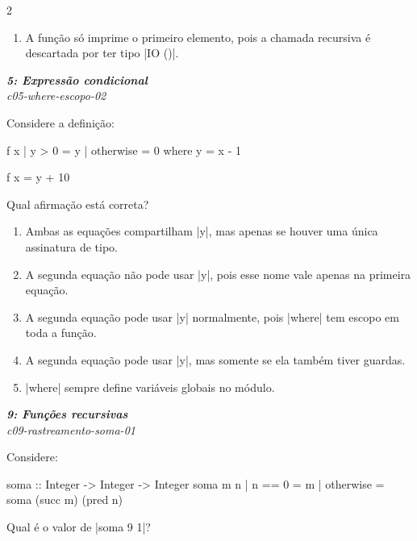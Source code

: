 \documentclass[a4paper,10pt,brazil]{article}
\begin{document}
\begin{multicols}{2}
\begin{enumerate}
  \item A função só imprime o primeiro elemento, pois a chamada recursiva é descartada por ter tipo \haskellinline|IO ()|.


\end{enumerate}

\begin{flushright}
  \footnotesize
  \textit{\textbf{5: Expressão condicional}}\\
  \textit{c05-where-escopo-02}\\

\end{flushright}
Considere a definição:
\begin{haskellcode}
f x
  | y > 0     = y
  | otherwise = 0
  where y = x - 1

f x = y + 10
\end{haskellcode}
Qual afirmação está correta?

\begin{enumerate}
  \item Ambas as equações compartilham \haskellinline|y|, mas apenas se houver uma única assinatura de tipo.

  \item A segunda equação não pode usar \haskellinline|y|, pois esse nome vale apenas na primeira equação.

  \item A segunda equação pode usar \haskellinline|y| normalmente, pois \haskellinline|where| tem escopo em toda a função.

  \item A segunda equação pode usar \haskellinline|y|, mas somente se ela também tiver guardas.

  \item \haskellinline|where| sempre define variáveis globais no módulo.


\end{enumerate}

\begin{flushright}
  \footnotesize
  \textit{\textbf{9: Funções recursivas}}\\
  \textit{c09-rastreamento-soma-01}\\

\end{flushright}
Considere:
\begin{haskellcode}
soma :: Integer -> Integer -> Integer
soma m n
  | n == 0    = m
  | otherwise = soma (succ m) (pred n)
\end{haskellcode}
Qual é o valor de \haskellinline|soma 9 1|?


\end{multicols}
\end{document}
